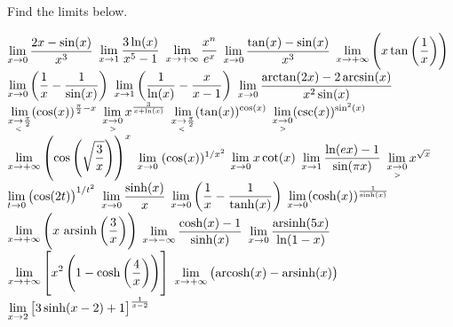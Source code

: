 \begin{Exercise} Find the limits below.
	\begin{multicols}{2}
		\Question[difficulty = 1] $\displaystyle\lim_{x\rightarrow 0}\dfrac{2x-\sin(x)}{x^3}$ 
		\Question[difficulty = 1] $\displaystyle\lim_{x\rightarrow 1} \dfrac{3\ln(x)}{x^5-1}$ 
		\Question[difficulty = 2] $\displaystyle\lim_{x\rightarrow +\infty}\dfrac{x^n}{e^x}$ 
		\ifanalysis\Question[difficulty = 1]\fi\ifcalculus\Question[difficulty = 2]\fi $\displaystyle\lim_{x\rightarrow 0}\dfrac{\tan(x)-\sin(x)}{x^3}$ 
		\Question[difficulty = 1] $\displaystyle\lim_{x\rightarrow +\infty}\left(x\tan\left(\dfrac{1}{x}\right)\right)$  
		\Question[difficulty = 1] $\displaystyle\lim_{x\rightarrow 0}\left(\dfrac{1}{x}-\dfrac{1}{\sin (x)}\right) $
		\Question[difficulty = 1] $\displaystyle\lim_{x\rightarrow 1}\left(\dfrac{1}{\ln (x)}-\dfrac{x}{x-1}\right) $ 
		\ifcalculus
		\Question[difficulty = 3] $\displaystyle\lim_{x\rightarrow 0}\dfrac{\arctan (2x) - 2 \arcsin (x)}{x^2 \sin(x)}$  
		\fi
		\Question[difficulty = 2] $\displaystyle\lim_{x\underset{<}{\rightarrow}  \frac{\pi}{2}} (\cos (x))^{\frac{\pi}{2}-x}$ 
		\Question[difficulty = 1] $\displaystyle\lim_{x\underset{>}{\rightarrow}  0} x^{\frac{3}{x+\ln (x)}} $ 
		\ifanalysis\Question[difficulty = 1]\fi\ifcalculus\Question[difficulty = 2]\fi $\displaystyle\lim_{x\underset{<}{\rightarrow}  \frac{\pi}{2}} (\tan (x))^{\cos (x)} $
		\ifanalysis\Question[difficulty = 1]\fi\ifcalculus\Question[difficulty = 2]\fi $\displaystyle\lim_{x\underset{>}{\rightarrow}  0} (\csc (x))^{\sin^2 (x)} $ 
		\Question[difficulty = 2] $\displaystyle\lim_{x\rightarrow +\infty} \left(\cos \left(\sqrt{\dfrac{3}{x}}\right) \right)^x$	
		\ifanalysis\Question[difficulty = 1]\fi\ifcalculus\Question[difficulty = 2]\fi $\displaystyle\lim_{x\rightarrow 0} \; (\cos   (x))^{1/x^2}$
		\Question[difficulty = 1] $\displaystyle\lim_{x\rightarrow 0} x \cot (x)$ 
		\ifanalysis
        \Question[difficulty = 1] $\displaystyle\lim_{x\rightarrow 1} \dfrac{\ln (e x) - 1}{\sin (\pi x)}$ 
        \Question[difficulty = 1] $\displaystyle\lim_{x\underset{>}{\rightarrow}  0} x^{\sqrt{x}}$ 
        \Question[difficulty = 2] $\displaystyle\lim_{t\rightarrow 0} \left(\cos (2t)\right)^{1/t^2}$
	    \Question[difficulty = 1] $\displaystyle\lim_{x\rightarrow 0}\dfrac{\sinh (x)}{x}$
        \Question[difficulty = 2] $\displaystyle\lim_{x\rightarrow 0}\left(\dfrac{1}{x}-\dfrac{1}{\tanh (x)}\right)$
        \Question[difficulty = 1] $\displaystyle\lim_{x\rightarrow 0}(\cosh  (x))^{\frac{1}{\sinh  (x)}}$
        \Question[difficulty = 1] $\displaystyle\lim_{x\rightarrow +\infty}\left( x\, \operatorname{arsinh} \left(\dfrac{3}{x}\right)\right)$
        \Question[difficulty = 1] $\displaystyle\lim_{x\rightarrow -\infty}\dfrac{\cosh (x) -1}{\sinh  (x)}$
        \Question[difficulty = 1] $\displaystyle\lim_{x\rightarrow 0} \dfrac{\operatorname{arsinh} (5x)}{\ln (1-x)}$
        \Question[difficulty = 2] $\displaystyle\lim_{x\rightarrow +\infty} \left[ x^2\left(1-\cosh \left(\dfrac{4}{x} \right) \right)\right]$
        \Question[difficulty = 2] $\displaystyle\lim_{x\rightarrow +\infty} \left(\operatorname{arcosh} (x) - \operatorname{arsinh} (x) \right)$
        \Question[difficulty = 2] $\displaystyle\lim_{x\rightarrow 2} \left[3\sinh (x-2)+1\right]^{\frac{1}{x-2}}$
        \fi
        \EndCurrentQuestion
    \end{multicols} 

\end{Exercise}


